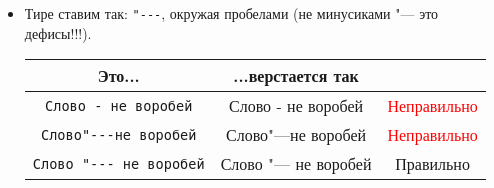 \documentclass[12pt,a4paper]{book}
\newcommand{\ok}{& \textcolor{green!60!black}{Правильно}}
\newcommand{\bad}{& \textcolor{red}{Неправильно}}
\begin{document}
\begin{enumerate}
\begin{itemize}
\begin{center}
\begin{tabular}{|c|c|c|}
\hline \verb'\langle a, \cfrac23\rangle' & $\langle a, \cfrac23\rangle$ \bad \\
\hline \verb'\left<a, \cfrac23\right>' & $\left<a, \cfrac23\right>$ \ok \\
\hline
\end{tabular}\end{center}
\item Тире ставим так: \verb'"---', окружая пробелами (не минусиками "--- это дефисы!!!).
\begin{center}\begin{tabular}{|c|c|c|}
\hline Это... & ...верстается так & \\
\hline \verb'Слово - не воробей' & Слово - не воробей \bad \\
\hline \verb'Слово"---не воробей' & Слово"---не воробей \bad \\
\hline \verb'Слово "--- не воробей' & Слово "--- не воробей \ok \\
\hline
\end{tabular}\end{center}
\end{itemize}
\end{enumerate}
\end{document}
